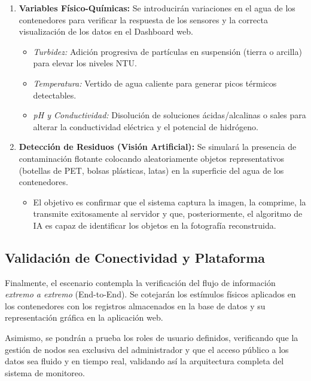 \begin{enumerate}
  \item \textbf{Variables Físico-Químicas:} Se introducirán variaciones en el agua de los contenedores para verificar la respuesta de los sensores y la correcta visualización de los datos en el Dashboard web.
    \begin{itemize}
      \item \textit{Turbidez:} Adición progresiva de partículas en suspensión (tierra o arcilla) para elevar los niveles NTU.
      \item \textit{Temperatura:} Vertido de agua caliente para generar picos térmicos detectables.
      \item \textit{pH y Conductividad:} Disolución de soluciones ácidas/alcalinas o sales para alterar la conductividad eléctrica y el potencial de hidrógeno.
    \end{itemize}

  \item \textbf{Detección de Residuos (Visión Artificial):} Se simulará la presencia de contaminación flotante colocando aleatoriamente objetos representativos (botellas de PET, bolsas plásticas, latas) en la superficie del agua de los contenedores.
    \begin{itemize}
      \item El objetivo es confirmar que el sistema captura la imagen, la comprime, la transmite exitosamente al servidor y que, posteriormente, el algoritmo de IA es capaz de identificar los objetos en la fotografía reconstruida.
    \end{itemize}
\end{enumerate}


\subsection{Validación de Conectividad y Plataforma}
\label{subsec:validacion_de_conectividad_y_plataforma}
Finalmente, el escenario contempla la verificación del flujo de información \textit{extremo a extremo} (End-to-End). Se cotejarán los estímulos físicos aplicados en los contenedores con los registros almacenados en la base de datos y su representación gráfica en la aplicación web.

Asimismo, se pondrán a prueba los roles de usuario definidos, verificando que la gestión de nodos sea exclusiva del administrador y que el acceso público a los datos sea fluido y en tiempo real, validando así la arquitectura completa del sistema de monitoreo.
